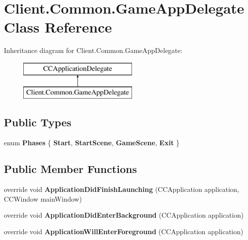 \hypertarget{classClient_1_1Common_1_1GameAppDelegate}{\section{Client.\-Common.\-Game\-App\-Delegate Class Reference}
\label{classClient_1_1Common_1_1GameAppDelegate}
}
Inheritance diagram for Client.\-Common.\-Game\-App\-Delegate\-:\begin{figure}[H]
\begin{center}
\leavevmode
\includegraphics[height=2.000000cm]{classClient_1_1Common_1_1GameAppDelegate}
\end{center}
\end{figure}
\subsection*{Public Types}
\begin{DoxyCompactItemize}
\item 
enum {\bfseries Phases} \{ {\bfseries Start}, 
{\bfseries Start\-Scene}, 
{\bfseries Game\-Scene}, 
{\bfseries Exit}
 \}
\end{DoxyCompactItemize}
\subsection*{Public Member Functions}
\begin{DoxyCompactItemize}
\item 
\hypertarget{classClient_1_1Common_1_1GameAppDelegate_aacda9c043b12acf24de4bc13a688f52e}{override void {\bfseries Application\-Did\-Finish\-Launching} (C\-C\-Application application, C\-C\-Window main\-Window)}\label{classClient_1_1Common_1_1GameAppDelegate_aacda9c043b12acf24de4bc13a688f52e}

\item 
\hypertarget{classClient_1_1Common_1_1GameAppDelegate_a524d489c10652931d4ea5159a34a72e5}{override void {\bfseries Application\-Did\-Enter\-Background} (C\-C\-Application application)}\label{classClient_1_1Common_1_1GameAppDelegate_a524d489c10652931d4ea5159a34a72e5}

\item 
\hypertarget{classClient_1_1Common_1_1GameAppDelegate_ad2625495e6b5a1c5853acde2ace6eccb}{override void {\bfseries Application\-Will\-Enter\-Foreground} (C\-C\-Application application)}\label{classClient_1_1Common_1_1GameAppDelegate_ad2625495e6b5a1c5853acde2ace6eccb}

\end{DoxyCompactItemize}
